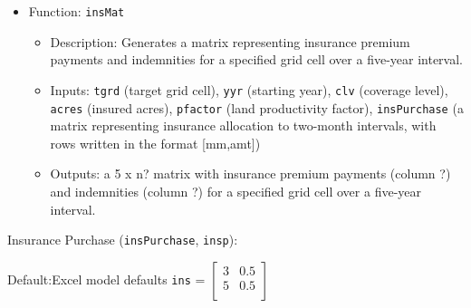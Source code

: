 \documentclass[11pt]{article}
\begin{document}
\begin{itemize}
\item Function: \verb!insMat!
	\begin{itemize}
	\item Description: Generates a matrix representing insurance premium payments and indemnities for a specified grid cell over a five-year interval. 
	\item Inputs: \verb!tgrd! (target grid cell), \verb!yyr! (starting year), \verb!clv! (coverage level), \verb!acres! (insured acres), \verb!pfactor! (land productivity factor), \verb!insPurchase! (a matrix representing insurance allocation to two-month intervals, with rows written in the format [mm,amt])
	\item Outputs: a 5 x n? matrix with insurance premium payments (column ?) and indemnities (column ?) for a specified grid cell over a five-year interval. 
	\end{itemize}
\end{itemize}
	






Insurance Purchase (\verb!insPurchase!, \verb!insp!):

Default:Excel model defaults
\verb!ins! = 
\( \begin{bmatrix}
3 & 0.5 \\
5 & 0.5 \\
\end{bmatrix}\) 
\end{document}
